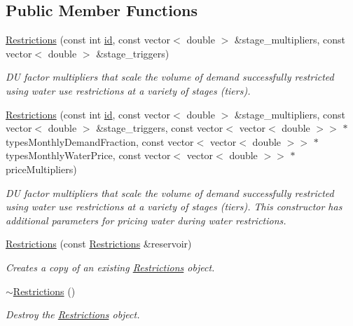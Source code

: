 \subsection*{Public Member Functions}
\begin{DoxyCompactItemize}
\item 
\mbox{\hyperlink{classRestrictions_aec6f37bfaec7d6e22e82945289fd9acc}{Restrictions}} (const int \mbox{\hyperlink{classDroughtMitigationPolicy_abf3ed19ed98e0d74dc9ae24094be640b}{id}}, const vector$<$ double $>$ \&stage\+\_\+multipliers, const vector$<$ double $>$ \&stage\+\_\+triggers)
\begin{DoxyCompactList}\small\item\em DU factor multipliers that scale the volume of demand successfully restricted using water use restrictions at a variety of stages (tiers). \end{DoxyCompactList}\item 
\mbox{\hyperlink{classRestrictions_a78083b572f1368bb863d40d7da807077}{Restrictions}} (const int \mbox{\hyperlink{classDroughtMitigationPolicy_abf3ed19ed98e0d74dc9ae24094be640b}{id}}, const vector$<$ double $>$ \&stage\+\_\+multipliers, const vector$<$ double $>$ \&stage\+\_\+triggers, const vector$<$ vector$<$ double $>$$>$ $\ast$types\+Monthly\+Demand\+Fraction, const vector$<$ vector$<$ double $>$$>$ $\ast$types\+Monthly\+Water\+Price, const vector$<$ vector$<$ double $>$$>$ $\ast$price\+Multipliers)
\begin{DoxyCompactList}\small\item\em DU factor multipliers that scale the volume of demand successfully restricted using water use restrictions at a variety of stages (tiers). This constructor has additional parameters for pricing water during water restrictions. \end{DoxyCompactList}\item 
\mbox{\hyperlink{classRestrictions_aa8653b70ff7eedb4e8fc1b21ebf2ead9}{Restrictions}} (const \mbox{\hyperlink{classRestrictions}{Restrictions}} \&reservoir)
\begin{DoxyCompactList}\small\item\em Creates a copy of an existing \mbox{\hyperlink{classRestrictions}{Restrictions}} object. \end{DoxyCompactList}\item 
\mbox{\hyperlink{classRestrictions_a54c8a857a2beed78d34a46c36951b004}{$\sim$\+Restrictions}} ()
\begin{DoxyCompactList}\small\item\em Destroy the \mbox{\hyperlink{classRestrictions}{Restrictions}} object. \end{DoxyCompactList}\item 
$$
\end{DoxyCompactItemize}
